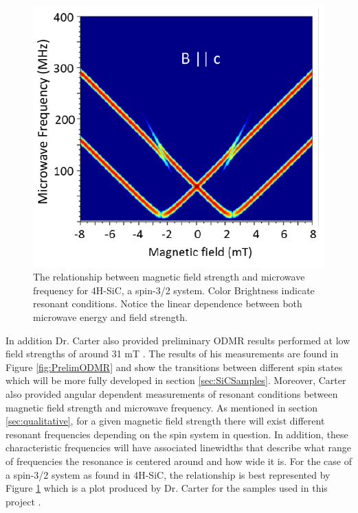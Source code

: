 \documentclass[oneside, noacknowlegments]{BYUPhys}
\begin{document}
\begin{figure}
    \centerline{\includegraphics{MFRelationship_fig}}
    \caption[Magnetic Field and Microwave Frequency Relationship]{\label{fig:MFRelationship}
     The relationship between magnetic field strength and microwave frequency for 4H-SiC, a spin-3/2 system.  Color Brightness indicate resonant conditions. Notice the linear dependence between both microwave energy and field strength.}
 \end{figure}

In addition Dr. Carter also provided preliminary ODMR results performed at low field strengths of around 31 mT \cite{RefWorks:doc:5892964ee4b0499fa95c5108}. The results of his measurements are found in Figure \ref{fig:PrelimODMR} and show the transitions between different spin states which will be more fully developed in section \ref{sec:SiCSamples}. Moreover, Carter also provided angular dependent measurements of resonant conditions between magnetic field strength and microwave frequency. As mentioned in section \ref{sec:qualitative}, for a given magnetic field strength there will exist different resonant frequencies depending on the spin system in question. In addition, these characteristic frequencies will have associated linewidths that describe what range of frequencies the resonance is centered around and how wide it is. For the case of a spin-3/2 system as found in 4H-SiC, the relationship is best represented by Figure \ref{fig:MFRelationship} which is a plot produced by Dr. Carter for the samples used in this project \cite{RefWorks:doc:5892964ee4b0499fa95c5108}.
 
\end{document}
